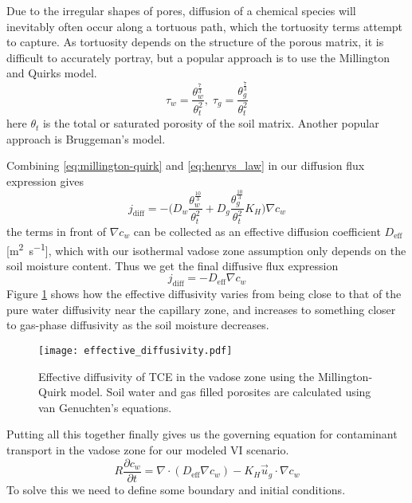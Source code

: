 Due to the irregular shapes of pores, diffusion of a chemical species will inevitably often occur along a tortuous path, which the tortuosity terms attempt to capture.
As tortuosity depends on the structure of the porous matrix, it is difficult to accurately portray, but a popular approach is to use the Millington and Quirks model\cite{millington_permeability_1961}.
\begin{equation}\label{eq:millington-quirk}
  \tau_w = \frac{\theta_w^{\frac{7}{3}}}{\theta_t^2}, \; \tau_g = \frac{\theta_g^{\frac{7}{3}}}{\theta_t^2}
\end{equation}
here $\theta_t$ is the total or saturated porosity of the soil matrix.
Another popular approach is Bruggeman's model.\par %

Combining \eqref{eq:millington-quirk} and \eqref{eq:henrys_law} in our diffusion flux expression gives
\begin{equation}
  j_\mathrm{diff} = -\Big(D_w \frac{\theta_w^{\frac{10}{3}}}{\theta_t^2} + D_g \frac{\theta_g^{\frac{10}{3}}}{\theta_t^2} K_H\Big) \nabla c_w
\end{equation}
the terms in front of $\nabla c_w$ can be collected as an effective diffusion coefficient $D_\mathrm{eff}$ [\si{\metre\squared\per\second}], which with our isothermal vadose zone assumption only depends on the soil moisture content.
Thus we get the final diffusive flux expression
\begin{equation}
  j_\mathrm{diff} = - D_\mathrm{eff}\nabla c_w
\end{equation}
Figure \ref{fig:D_eff} shows how the effective diffusivity varies from being close to that of the pure water diffusivity near the capillary zone, and increases to something closer to gas-phase diffusivity as the soil moisture decreases.\par

\begin{figure}
  \texttt{[image: effective\_diffusivity.pdf]}
  \caption{Effective diffusivity of TCE in the vadose zone using the Millington-Quirk model. Soil water and gas filled porosites are calculated using van Genuchten's equations.}
  \label{fig:D_eff}
\end{figure}

Putting all this together finally gives us the governing equation for contaminant transport in the vadose zone for our modeled VI scenario.
\begin{equation}\label{eq:mass_transport}
  R \frac{\partial c_w}{\partial t} = \nabla \cdot (D_\mathrm{eff} \nabla c_w) - K_H \vec{u}_g \cdot \nabla c_w
\end{equation}
To solve this we need to define some boundary and initial conditions.\par

